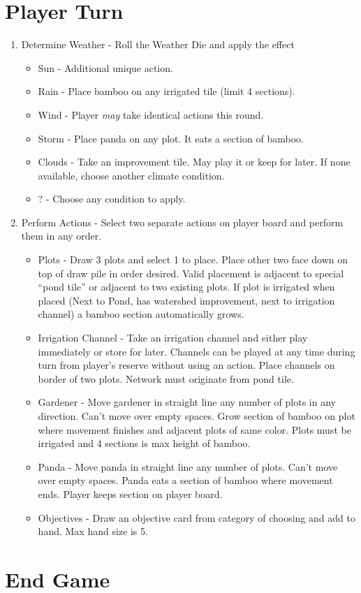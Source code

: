 \documentclass[12pt]{article}
\newenvironment{enumerateCustom}
{\begin{enumerate}
  \setlength{\itemsep}{1pt}
  \setlength{\parskip}{0pt}
  \setlength{\parsep}{0pt}}
{\end{enumerate}}
\newenvironment{itemizeCustom}
{\begin{itemize}
  \setlength{\itemsep}{1pt}
  \setlength{\parskip}{0pt}
  \setlength{\parsep}{0pt}}
{\end{itemize}}
\begin{document}
\begin{mdframed}[style = customFrame]
\begin{multicols*}{2}
\section*{Player Turn}
\begin{enumerateCustom}
	\item Determine Weather - Roll the Weather Die and apply the effect
		\begin{itemizeCustom}
			\item Sun - Additional unique action.
			\item Rain - Place bamboo on any irrigated tile (limit 4 sections).
			\item Wind - Player \emph{may} take identical actions this round.
			\item Storm - Place panda on any plot. It eats a section of bamboo.
			\item Clouds - Take an improvement tile. May play it or keep for later. If none available, choose another climate condition.
			\item ? - Choose any condition to apply.
		\end{itemizeCustom}
	\item Perform Actions - Select two separate actions on player board and perform them in any order.
		\begin{itemizeCustom}
			\item Plots - Draw 3 plots and select 1 to place. Place other two face down on top of draw pile in order desired. Valid placement is adjacent to special ``pond tile'' or adjacent to two existing plots. If plot is irrigated when placed (Next to Pond, has watershed improvement, next to irrigation channel) a bamboo section automatically grows.
			\item Irrigation Channel - Take an irrigation channel and either play immediately or store for later. Channels can be played at any time during turn from player's reserve without using an action. Place channels on border of two plots. Network must originate from pond tile.
			\item Gardener - Move gardener in straight line any number of plots in any direction. Can't move over empty spaces. Grow section of bamboo on plot where movement finishes and adjacent plots of same color. Plots must be irrigated and 4 sections is max height of bamboo.
			\item Panda - Move panda in straight line any number of plots. Can't move over empty spaces. Panda eats a section of bamboo where movement ends. Player keeps section on player board.
			\item Objectives - Draw an objective card from category of choosing and add to hand. Max hand size is 5.
		\end{itemizeCustom}
\end{enumerateCustom}
\section*{End Game}

\end{multicols*}
\end{mdframed}
\end{document}
